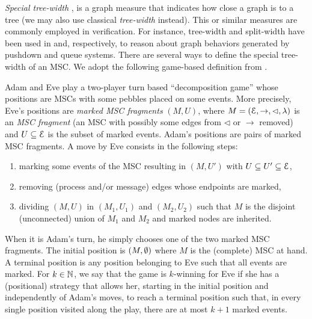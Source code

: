 \documentclass[a4paper,UKenglish,cleveref, autoref, thm-restate]{lipics-v2021}
\begin{document}
\emph{Special tree-width} \cite{Courcelle10},
is a graph measure that indicates how close
a graph is to a tree (we may also use classical
	\emph{tree-width} instead).
This or similar measures are commonly employed in verification. For instance, tree-width and split-width have been used in \cite{MadhusudanP11} and, respectively, \cite{DBLP:conf/concur/CyriacGK12,AiswaryaGK14} to reason about graph behaviors generated by pushdown and queue systems.
There are several ways to define the special tree-width of an MSC.
We adopt the following game-based definition from \cite{DBLP:journals/corr/abs-1904-06942}.

Adam and Eve play a two-player turn based ``decomposition game''
whose positions
are MSCs with some pebbles placed on some events.
More precisely, Eve's positions are
\emph{marked MSC fragments} $(M, U)$, where
$M = (\mathcal{E}, \to, \lhd, \lambda)$
is an \emph{MSC fragment} (an MSC with possibly some edges from
$\lhd$ or $\to$ removed)
 and $U \subseteq \mathcal{E}$ is the subset of marked events.
Adam's positions are pairs of marked MSC fragments.
A move by Eve consists in the following steps:
\begin{enumerate}
	\item marking some events of the MSC resulting in $(M, U')$ with $U \subseteq U' \subseteq \mathcal{E}$,
	\item removing (process and/or message) edges whose endpoints are marked,
	\item dividing $(M, U)$ in $(M_1, U_1)$ and $(M_2, U_2)$ such that $M$ is the disjoint (unconnected) union of $M_1$ and $M_2$
	and marked nodes are inherited.
\end{enumerate}
When it is Adam's turn, he simply chooses one of the two marked MSC fragments.
The initial position is $(M,\emptyset)$ where $M$ is the (complete) MSC at hand. A terminal position is any position belonging to Eve such that all events are marked.
%
For $k \in \mathbb{N}$, we say that the game is $k$-winning for Eve if she has a (positional) strategy that allows her,
starting in the initial position and independently of Adam's moves, to reach a terminal position such that, in every single position visited along the play, there are at most $k+1$ marked events.

\newcommand{\CS}[2]{\mathsf{CS}_{(#1,#2)}}
\newcommand{\MSO}[2]{\mathsf{MSO}_{(#1,#2)}}
\newcommand{\LCPDL}[2]{\mathsf{LCPDL}_{(#1,#2)}}
\newcommand{\MSCpm}[2]{\mathsf{MSC}_{(#1,#2)}}
\newcommand{\mbMSCpm}[2]{\mathsf{MSC}_{(#1,#2)}^{\mathsf{mb}}}
\end{document}

